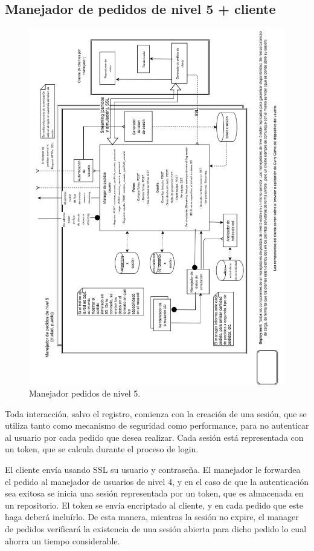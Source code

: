 \subsection{Manejador de pedidos de nivel 5 + cliente}

\begin{figure}[H]
   \centering
   \includegraphics[height=0.95\textheight]{reentrega/imagenes/nivel-5-manejador-cliente.png}
   \caption{Manejador pedidos de nivel 5.}
\end{figure}

Toda interacción, salvo el registro, comienza con la creación de una sesión, que se utiliza tanto como mecanismo de seguridad como performance, para no autenticar al usuario por cada pedido que desea realizar.
Cada sesión está representada con un token, que se calcula durante el proceso de login.

El cliente envía usando SSL su usuario y contraseña. El manejador le forwardea el pedido al manejador de usuarios de nivel 4, y en el caso de que la autenticación sea exitosa se inicia una sesión representada por un token, que es almacenada en un repositorio. El token se envía encriptado al cliente, y en cada pedido que este haga deberá incluírlo. De esta manera, mientras la sesión no expire, el manager de pedidos verificará la existencia de una sesión abierta para dicho pedido lo cual ahorra un tiempo considerable.

